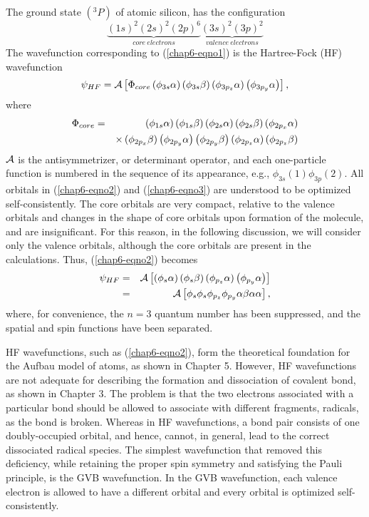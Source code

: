 The ground state $({^3P})$ of atomic silicon, has the configuration
\begin{equation}
\underbrace{(1s)^2(2s)^2(2p)^6}_{core ~ electrons} 
\underbrace{(3s)^2(3p)^2}_{valence ~ electrons}
\label{chap6-eqno1}
\end{equation}
The wavefunction corresponding to (\ref{chap6-eqno1}) is the
Hartree-Fock (HF) wavefunction
\begin{equation}
\psi_{HF} = {\cal A} \left[ \Phi_{core} \left( \phi_{3s} \alpha 
\right) \left( \phi_{3s} \beta \right) \left( \phi_{3p_z} \alpha 
\right) \left( \phi_{3p_y} \alpha \right) \right] ,
\label{chap6-eqno2}
\end{equation}
where
\begin{eqnarray}
\Phi_{core} &=&\left( \phi_{1s} \alpha \right) \left( \phi_{1s} \beta 
\right) \left( \phi_{2s} \alpha \right) \left( \phi_{2s} \beta 
\right) \left( \phi_{2p_x} \alpha \right)\cr
&& \times \left( \phi_{2p_x} \beta 
\right) \left( \phi_{2p_y} \alpha \right) \left( \phi_{2p_y} \beta 
\right) \left( \phi_{2p_z} \alpha \right) \left( \phi_{2p_z} 
\beta \right)\cr
\label{chap6-eqno3}
\end{eqnarray}
${\cal A}$ is the antisymmetrizer, or determinant operator, and each
one-particle function is numbered in the sequence of its appearance,
e.g., $\phi_{3s}(1) \phi_{3p}(2)$.  All orbitals in
(\ref{chap6-eqno2}) and (\ref{chap6-eqno3}) are understood to be
optimized self-consistently.  The core orbitals are very compact,
relative to the valence orbitals and changes in the shape of core
orbitals upon formation of the molecule, and are insignificant.  For
this reason, in the following discussion, we will consider only the
valence orbitals, although the core orbitals are present in the
calculations.  Thus, (\ref{chap6-eqno2}) becomes
\begin{eqnarray}
\psi_{HF} &=& {\cal A} \left[ \left( \phi_s \alpha \right) 
\left( \phi_s \beta \right) \left( \phi_{p_z} \alpha \right) \left( 
\phi_{p_y} \alpha \right) \right]\cr
&=& {\cal A} \left[ \phi_s \phi_s \phi_{p_z} \phi_{p_y} \alpha \beta 
\alpha \alpha \right],
\end{eqnarray}
where, for convenience, the $n = 3$ quantum number has been 
suppressed, and the spatial and spin functions have been separated.

HF wavefunctions, such as (\ref{chap6-eqno2}), form the
theoretical foundation for the Aufbau model of atoms, as shown in
Chapter 5.  However, HF wavefunctions are not adequate for
describing the formation and dissociation of covalent bond, as shown
in Chapter 3.  The problem is that the two electrons associated with a
particular bond should be allowed to associate with different
fragments, radicals, as the bond is broken.  Whereas in HF
wavefunctions, a bond pair consists of one doubly-occupied orbital,
and hence, cannot, in general, lead to the correct dissociated radical
species.  The simplest wavefunction that removed this deficiency,
while retaining the proper spin symmetry and satisfying the Pauli
principle, is the GVB wavefunction.  In the
GVB wavefunction, each valence electron is
allowed to have a different orbital and every orbital is optimized
self-consistently.

